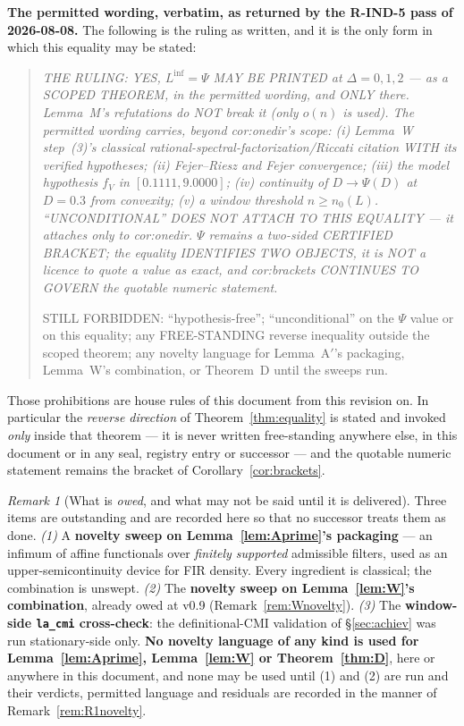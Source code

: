 \documentclass[11pt]{article}
\theoremstyle{definition}
\theoremstyle{remark}
\newtheorem{remark}{Remark}
\begin{document}
\medskip\noindent\textbf{The permitted wording, verbatim, as returned by the
R-IND-5 pass of 2026-08-08.} The following is the ruling as written, and it is
the only form in which this equality may be stated:

\begin{quote}\itshape
THE RULING: YES, $L^{\inf}=\Psi$ MAY BE PRINTED at $\Delta=0,1,2$ --- as a
SCOPED THEOREM, in the permitted wording, and ONLY there. Lemma~M's
refutations do NOT break it (only $o(n)$ is used). The permitted wording
carries, beyond \textrm{cor:onedir}'s scope: (i) Lemma~W step~(3)'s classical
rational-spectral-factorization/Riccati citation WITH its verified
hypotheses; (ii) Fejer--Riesz and Fejer convergence; (iii) the model
hypothesis $f_V$ in $[0.1111, 9.0000]$; (iv) continuity of
$D\to\Psi(D)$ at $D=0.3$ from convexity; (v) a window threshold $n\ge n_0(L)$.
``UNCONDITIONAL'' DOES NOT ATTACH TO THIS EQUALITY --- it attaches only to
\textrm{cor:onedir}. $\Psi$ remains a two-sided CERTIFIED BRACKET; the
equality IDENTIFIES TWO OBJECTS, it is NOT a licence to quote a value as
exact, and \textrm{cor:brackets} CONTINUES TO GOVERN the quotable numeric
statement.

STILL FORBIDDEN: ``hypothesis-free''; ``unconditional'' on the $\Psi$ value or
on this equality; any FREE-STANDING reverse inequality outside the scoped
theorem; any novelty language for Lemma~A$'$'s packaging, Lemma~W's
combination, or Theorem~D until the sweeps run.
\end{quote}

\noindent Those prohibitions are house rules of this document from this
revision on. In particular the \emph{reverse direction} of
Theorem~\ref{thm:equality} is stated and invoked \emph{only} inside that
theorem --- it is never written free-standing anywhere else, in this document
or in any seal, registry entry or successor --- and the quotable numeric
statement remains the bracket of Corollary~\ref{cor:brackets}.

\begin{remark}[What is \emph{owed}, and what may not be said until it is
delivered]
\label{rem:F085owed}
Three items are outstanding and are recorded here so that no successor treats
them as done.
\emph{(1)} A \textbf{novelty sweep on Lemma~\ref{lem:Aprime}'s packaging} ---
an infimum of affine functionals over \emph{finitely supported} admissible
filters, used as an upper-semicontinuity device for FIR density. Every
ingredient is classical; the combination is unswept.
\emph{(2)} The \textbf{novelty sweep on Lemma~\ref{lem:W}'s combination},
already owed at v0.9 (Remark~\ref{rem:Wnovelty}).
\emph{(3)} The \textbf{window-side \texttt{la\_cmi} cross-check}: the
definitional-CMI validation of \S\ref{sec:achiev} was run stationary-side
only.
\textbf{No novelty language of any kind is used for Lemma~\ref{lem:Aprime},
Lemma~\ref{lem:W} or Theorem~\ref{thm:D}}, here or anywhere in this document,
and none may be used until (1) and (2) are run and their verdicts, permitted
language and residuals are recorded in the manner of
Remark~\ref{rem:R1novelty}.
\end{remark}
\end{document}
